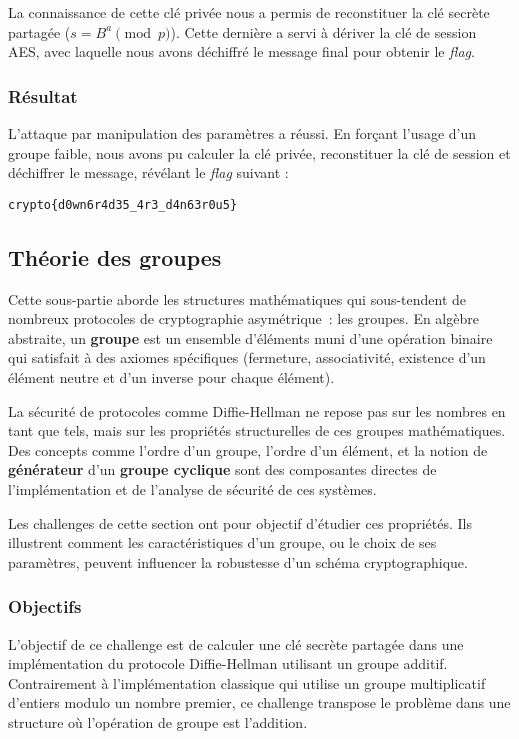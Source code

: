     La connaissance de cette clé privée nous a permis de reconstituer la clé
    secrète partagée ($s = B^a \pmod{p}$). Cette dernière a servi à dériver la
    clé de session AES, avec laquelle nous avons déchiffré le message final
    pour obtenir le \textit{flag}.

    \subsubsection{Résultat}
    L'attaque par manipulation des paramètres a réussi. En forçant l'usage d'un
    groupe faible, nous avons pu calculer la clé privée, reconstituer la clé de
    session et déchiffrer le message, révélant le \textit{flag} suivant :

    \begin{center}
        \texttt{crypto\{d0wn6r4d35\_4r3\_d4n63r0u5\}}
    \end{center}

    \subsection{Théorie des groupes}
    Cette sous-partie aborde les structures mathématiques qui sous-tendent de
    nombreux protocoles de cryptographie asymétrique~: les groupes. En
    algèbre abstraite, un \textbf{groupe} est un ensemble d'éléments muni d'une
    opération binaire qui satisfait à des axiomes spécifiques (fermeture,
    associativité, existence d'un élément neutre et d'un inverse pour chaque
    élément).

    La sécurité de protocoles comme Diffie-Hellman ne repose pas sur les
    nombres en tant que tels, mais sur les propriétés structurelles de ces
    groupes mathématiques. Des concepts comme l'ordre d'un groupe, l'ordre
    d'un élément, et la notion de \textbf{générateur} d'un \textbf{groupe
    cyclique} sont des composantes directes de l'implémentation et de
    l'analyse de sécurité de ces systèmes.

    Les challenges de cette section ont pour objectif d'étudier ces
    propriétés. Ils illustrent comment les caractéristiques d'un groupe, ou le
    choix de ses paramètres, peuvent influencer la robustesse d'un schéma
    cryptographique.

    \subsubsection{Objectifs}
    L'objectif de ce challenge est de calculer une clé secrète partagée dans une
    implémentation du protocole Diffie-Hellman utilisant un groupe additif.
    Contrairement à l'implémentation classique qui utilise un groupe
    multiplicatif d'entiers modulo un nombre premier, ce challenge transpose le
    problème dans une structure où l'opération de groupe est l'addition.

